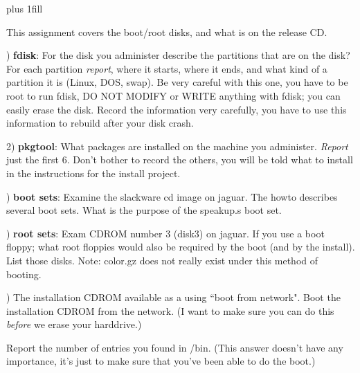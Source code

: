 
\rightskip=0pt plus 1fill

\parindent 0pt

This assignment covers the boot/root disks, and what is on the release CD.

) {\bf fdisk}:
For the disk you administer describe the partitions that are on the disk?
For each partition {\it report}, where it starts, where it ends, and what kind
of a partition it is (Linux, DOS, swap).
Be very careful with this one, you have to be root to run fdisk,
DO NOT MODIFY or WRITE anything with fdisk; 
you can easily erase the disk.
Record the information very carefully, you have to use this information
to rebuild after your disk crash.

2) {\bf pkgtool}:
What packages are installed on the machine you administer.
{\it Report} just the first 6. Don't bother to record the others, you will
be told what to install in the instructions for the install project.

) {\bf boot sets}:
Examine the slackware cd image on {\ltt{}jaguar}.
The howto describes several boot sets.
What is the purpose of the {\ltt{}speakup.s} boot set.

) {\bf root sets}:
Exam CDROM number 3 (disk3) on {\ltt{}jaguar}.
If you use a boot floppy;
what root floppies would also be required by the boot (and
by the install).
List those disks. Note: {\ltt{}color.gz} does not really
exist under this method of booting.

) The installation CDROM available as a using ``boot from network".
Boot the installation CDROM from the network. (I want to make sure
you can do this {\it before} we erase your harddrive.)

Report the number of entries you found in {\ltt{}/bin}.
(This answer doesn't have any importance, it's just to make sure
that you've been able to do the boot.)

\bye

